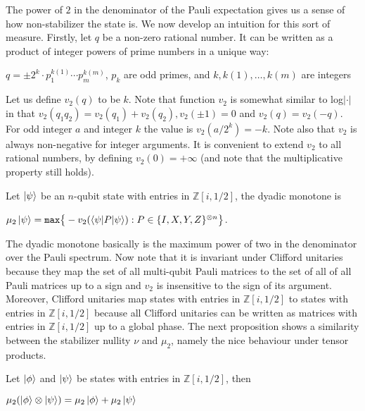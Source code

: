 \documentclass[12pt]{dalthesis}
\begin{document}
The power of $2$ in the denominator of the Pauli expectation gives us a sense of how non-stabilizer the state is. We now develop an intuition for this sort of measure. Firstly, let $q$ be a non-zero rational number. It can be written as a product of integer powers of prime numbers in a unique way:
\begin{center}
$q = \pm 2^k \cdot p_1^{k(1)} \cdots p_m^{k(m)}$, $p_k$ are odd primes, and $k, k(1), \dots , k(m)$ are integers
\end{center}

Let us define $v_2 (q)$ to be $k$. Note that function $v_2$ is somewhat similar to log$|\cdot|$ in that $v_2(q_1q_2) = v_2(q_1) + v_2(q_2), v_2(\pm 1) = 0$ and $v_2 (q) = v_2 (-q)$. For odd integer $a$ and integer $k$ the value is $v_2 (a/2^k) = - k$. Note also that $v_2$ is always non-negative for integer arguments. It is convenient to extend $v_2$ to all rational numbers, by defining $v_2(0) = + \infty $ (and note that the multiplicative property still holds).
\begin{definition}
Let $\ket{\psi}$ be an $n$-qubit state with entries in $\mathbb{Z}[i, 1/2]$, the dyadic monotone is 
\begin{center}
$\mu_2 \ket{\psi} = \texttt{max} \big\{-v_2(\braket{\psi | P | \psi}): P \in \{I, X, Y, Z \}^{\otimes n} \big\}$.
\end{center}
\end{definition}
The dyadic monotone basically is the maximum power of two in the denominator over the Pauli spectrum. Now note that it is invariant under Clifford unitaries because they map the set of all multi-qubit Pauli matrices to the set of all of all Pauli matrices up to a sign and $v_2$ is insensitive to the sign of its argument. Moreover, Clifford unitaries map states with entries in $\mathbb{Z}[i, 1/2]$ to states with entries in $\mathbb{Z}[i, 1/2]$ because all Clifford unitaries can be written as matrices with entries in $\mathbb{Z}[i, 1/2]$ up to a global phase. The next proposition shows a similarity between the stabilizer nullity $\nu$ and $\mu_2$, namely the nice behaviour under tensor products.

\begin{proposition}
Let $\ket{\phi}$ and $\ket{\psi}$ be states with entries in $\mathbb{Z}[i, 1/2]$, then 
\begin{center}
$\mu_2 (\ket{\phi} \otimes \ket{\psi}) = \mu_2 \ket{\phi} + \mu_2 \ket{\psi}$
\end{center}
\end{proposition}
\end{document}
